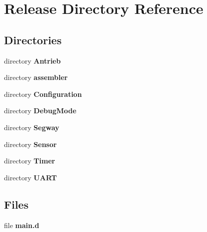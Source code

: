 \section{Release Directory Reference}
\label{dir_92709420fde8ca446636ff7c23065e8b}
\subsection*{Directories}
\begin{DoxyCompactItemize}
\item 
directory {\bf Antrieb}
\item 
directory {\bf assembler}
\item 
directory {\bf Configuration}
\item 
directory {\bf Debug\+Mode}
\item 
directory {\bf Segway}
\item 
directory {\bf Sensor}
\item 
directory {\bf Timer}
\item 
directory {\bf U\+A\+R\+T}
\end{DoxyCompactItemize}
\subsection*{Files}
\begin{DoxyCompactItemize}
\item 
file {\bfseries main.\+d}
\end{DoxyCompactItemize}
